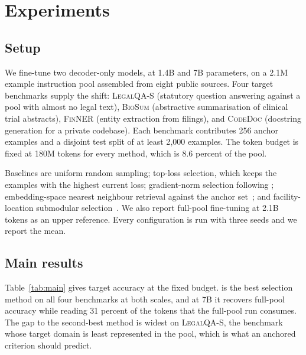 \section{Experiments}
\label{sec:experiments}

\subsection{Setup}

We fine-tune two decoder-only models, at 1.4B and 7B parameters, on a 2.1M
example instruction pool assembled from eight public sources. Four target
benchmarks supply the shift: \textsc{LegalQA-S} (statutory question answering
against a pool with almost no legal text), \textsc{BioSum} (abstractive
summarisation of clinical trial abstracts), \textsc{FinNER} (entity extraction
from filings), and \textsc{CodeDoc} (docstring generation for a private
codebase). Each benchmark contributes 256 anchor examples and a disjoint test
split of at least 2{,}000 examples. The token budget is fixed at 180M tokens
for every method, which is 8.6 percent of the pool.

Baselines are uniform random sampling; top-loss selection, which keeps the
examples with the highest current loss; gradient-norm selection following
\citet{arbogast2021gradnorm}; embedding-space nearest neighbour retrieval
against the anchor set~\citep{iwasaki2022retrieval}; and facility-location
submodular selection~\citep{delacroix2020submodular}. We also report full-pool
fine-tuning at 2.1B tokens as an upper reference. Every configuration is run
with three seeds and we report the mean.

\subsection{Main results}

Table~\ref{tab:main} gives target accuracy at the fixed budget. \method{} is
the best selection method on all four benchmarks at both scales, and at 7B it
recovers full-pool accuracy while reading 31 percent of the tokens that the
full-pool run consumes. The gap to the second-best method is widest on
\textsc{LegalQA-S}, the benchmark whose target domain is least represented in
the pool, which is what an anchored criterion should predict.

